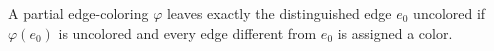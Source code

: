 \begin{definition}
A partial edge-coloring $\varphi$ leaves exactly the distinguished edge
$e_0$ uncolored if $\varphi(e_0)$ is uncolored and every edge different from
$e_0$ is assigned a color.
\end{definition}
